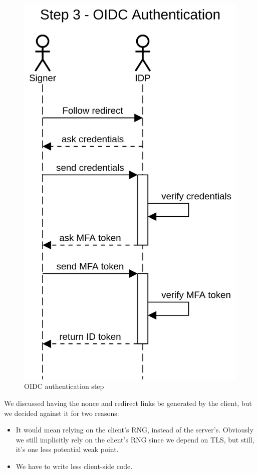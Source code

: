 \begin{figure}[H]
	\begin{center}
		\includegraphics[scale=0.5]{images/protocol_step3_oidc_authentication.png}
		\caption{OIDC authentication step}
		\label{fig:oidcauthenticationstep}
	\end{center}
\end{figure}

We discussed having the nonce and redirect links be generated by the client,
but we decided against it for two reasons:
\begin{itemize}
    \item It would mean relying on the client's \gls{RNG}, instead of the server's.
    Obviously we still implicitly rely on the client's \gls{RNG} since we depend on \gls{TLS},
    but still, it's one less potential weak point.
    \item We have to write less client-side code.
\end{itemize}

